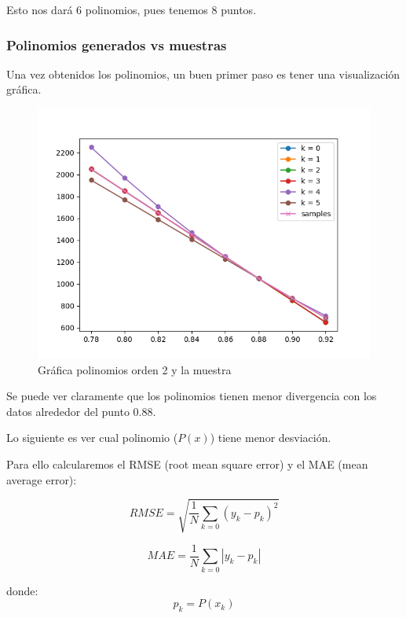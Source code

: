 Esto nos dará 6 polinomios, pues tenemos 8 puntos.	

\newpage 

\subsubsection{Polinomios generados vs muestras}

Una vez obtenidos los polinomios, un buen primer paso es tener una visualización gráfica. 

\begin{figure}[H]
	\includegraphics[width=\linewidth]{figures/figure1.png}
	\caption{Gráfica polinomios orden 2 y la muestra}
	\label{fig:interp_cuad}
\end{figure}

Se puede ver claramente que los polinomios tienen menor divergencia con los datos alrededor del punto 0.88.



Lo siguiente es ver cual polinomio ($P(x)$) tiene menor desviación.

Para ello calcularemos el RMSE (root mean square error) y el MAE (mean average error): 

\begin{equation}
	RMSE = \sqrt{ \frac{1}{N} \sum_{k=0} (y_k - p_k)^2 }
\end{equation}

\begin{equation}
	MAE = \frac{1}{N} \sum_{k=0} |{y_k - p_k}|
\end{equation}

donde:
$$ p_k = P(x_k) $$



